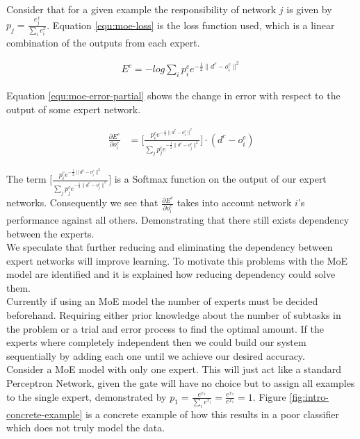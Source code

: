 \documentclass[notitlepage]{report}
\theoremstyle{definition}
\begin{document}
Consider that for a given example the responsibility of network $j$ is given by $p_j = \frac{e^x_j}{\sum_i e^x_i}$. Equation \ref{equ:moe-loss} is the loss function used, which is a linear combination of the outputs from each expert.

\begin{align}
E^c = -log \sum_i p^c_i e^{-\frac{1}{2} \lVert d^c - o_i^c \rVert^2 }
\label{equ:moe-loss}
\end{align}

Equation \ref{equ:moe-error-partial} shows the change in error with respect to the output of some expert network.

\begin{align}
\frac{\partial E^c}{\partial o_i^c} &= \bigg[ \frac{p_i^c e^{-\frac{1}{2} \lVert d^c - o_i^c \rVert^2}}{\sum_j p_j^c e^{-\frac{1}{2} \lVert d^c - o_j^c \rVert^2}} \bigg] \cdot (d^c - o_i^c)
\label{equ:moe-error-partial}
\end{align}

The term $\bigg[ \frac{p_i^c e^{-\frac{1}{2} \lVert d^c - o_i^c \rVert^2}}{\sum_j p_j^c e^{-\frac{1}{2} \lVert d^c - o_j^c \rVert^2}} \bigg]$ is a Softmax function on the output of our expert networks. Consequently we see that $\frac{\partial E^c}{\partial o_i^c}$ takes into account network $i$'s performance against all others. Demonstrating that there still exists dependency between the experts.\\

We speculate that further reducing and eliminating the dependency between expert networks will improve learning. To motivate this problems with the MoE model are identified and it is explained how reducing dependency could solve them.\\ 

Currently if using an MoE model the number of experts must be decided beforehand. Requiring either prior knowledge about the number of subtasks in the problem or a trial and error process to find the optimal amount. If the experts where completely independent then we could build our system sequentially by adding each one until we achieve our desired accuracy.\\

Consider a MoE model with only one expert. This will just act like a standard Perceptron Network, given the gate will have no choice but to assign all examples to the single expert, demonstrated by $p_1 = \frac{e^{x_1}}{\sum_i e^{x_i}} = \frac{e^{x_1}}{e^{x_1}} = 1$. Figure \ref{fig:intro-concrete-example} is a concrete example of how this results in a poor classifier which does not truly model the data. 
\end{document}

